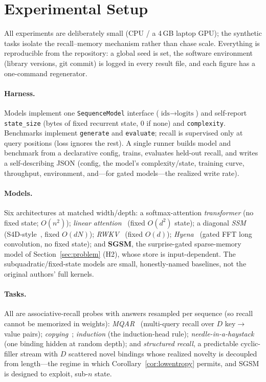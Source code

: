 \section{Experimental Setup}
\label{sec:experiments}

All experiments are deliberately small (CPU / a 4\,GB laptop GPU); the synthetic tasks isolate the
recall--memory mechanism rather than chase scale. Everything is reproducible from the repository:
a global seed is set, the software environment (library versions, git commit) is logged in every
result file, and each figure has a one-command regenerator.

\paragraph{Harness.} Models implement one \texttt{SequenceModel} interface
($\text{ids}\to\text{logits}$) and self-report \texttt{state\_size} (bytes of fixed recurrent
state, $0$ if none) and \texttt{complexity}. Benchmarks implement \texttt{generate} and
\texttt{evaluate}; recall is supervised only at query positions (loss ignores the rest). A single
runner builds model and benchmark from a declarative config, trains, evaluates held-out recall,
and writes a self-describing JSON (config, the model's complexity/state, training curve,
throughput, environment, and---for gated models---the realized write rate).

\paragraph{Models.} Six architectures at matched width/depth: a softmax-attention
\emph{transformer} (no fixed state; $O(n^2)$); \emph{linear attention}~\citep{katharopoulos2020transformers}
(fixed $O(d^2)$ state); a diagonal \emph{SSM} (S4D-style~\citep{gu2022s4}, fixed $O(dN)$);
\emph{RWKV}~\citep{peng2023rwkv} (fixed $O(d)$); \emph{Hyena}~\citep{poli2023hyena} (gated FFT long
convolution, no fixed state); and \textbf{SGSM}, the surprise-gated sparse-memory model of
Section~\ref{sec:problem} (H2), whose store is input-dependent. The subquadratic/fixed-state models
are small, honestly-named baselines, not the original authors' full kernels.

\paragraph{Tasks.} All are associative-recall probes with answers resampled per sequence (so recall
cannot be memorized in weights): \emph{MQAR}~\citep{arora2024zoology} (multi-query recall over $D$
key$\rightarrow$value pairs); \emph{copying}~\citep{jelassi2024copying}; \emph{induction} (the
induction-head rule); \emph{needle-in-a-haystack} (one binding hidden at random depth); and
\emph{structured recall}, a predictable cyclic-filler stream with $D$ scattered novel bindings
whose realized novelty is decoupled from length---the regime in which
Corollary~\ref{cor:lowentropy} permits, and SGSM is designed to exploit, sub-$n$ state.

